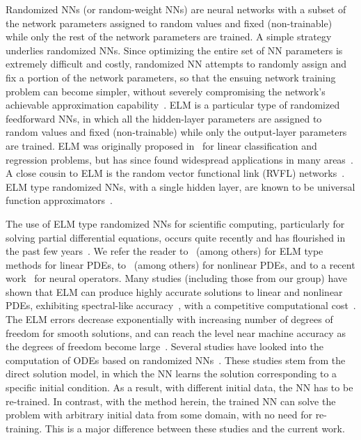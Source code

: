 Randomized NNs (or random-weight NNs)
are neural networks 
with a subset of the network parameters assigned to random values and fixed (non-trainable)
while only the rest of the network parameters are trained.
A simple strategy underlies randomized NNs. Since optimizing
the entire set of NN parameters is extremely difficult and  costly,
randomized NN attempts to randomly assign and fix a portion of the network parameters,
so that the ensuing network training problem can become simpler,
without severely compromising the network's achievable approximation
capability~\cite{DongY2022rm,NiD2023}.
ELM is a particular type of randomized feedforward NNs, in which all the hidden-layer
parameters are assigned to random values and fixed (non-trainable) while
only the output-layer parameters are trained. ELM was originally proposed
in~\cite{HuangZS2006} for linear classification and regression problems,
but has since found widespread applications  in many areas~\cite{Alabaetal2019}.
A close cousin to ELM is the %
random vector functional link (RVFL) networks~\cite{PaoPS1994}.
ELM type  randomized NNs, with a single hidden layer,
are known to be universal function
approximators~\cite{IgelnikP1995,HuangCS2006,Gonon2023}.



The use of ELM type randomized NNs  for scientific computing,
particularly for solving partial differential equations, occurs quite recently
and has flourished in the past few
years~\cite{DongL2021,Schiassietal2021,CalabroFS2021,WangD2024}.
We refer the reader to~\cite{PanghalK2020,DwivediS2020,DongL2021,LiuHWC2021,CalabroFS2021,ChenCEY2022,LiLX2023,QuanH2023,Calabroetal2023,SunDF2024} (among others) for ELM type methods
for linear PDEs, to~\cite{DongL2021,DongL2021bip,Schiassietal2021,FabianiCRS2021,DongY2022rm,NiD2023,DongW2023,WangD2024} (among others) for nonlinear PDEs,
and to a recent work~\cite{FabianiKSY2025} for neural operators.
%
Many studies (including those from our group) have shown that
ELM  can produce highly accurate solutions to linear and nonlinear
PDEs, exhibiting spectral-like accuracy~\cite{DongL2021,NiD2023},
with a competitive computational cost~\cite{DongY2022rm}.
The ELM errors decrease exponentially
with increasing number of degrees of freedom for smooth solutions, and
can reach the level near machine accuracy as the degrees of freedom
become large~\cite{DongY2022rm}. 
%
Several studies have looked into the computation of ODEs
based on randomized NNs~\cite{YangHL2018,LiuXWL2020,PanghalK2020,DongL2021,Schiassietal2022,FabianiGRS2023,FlorioSCF2023}.
These studies stem from the direct solution model, in which the NN
learns the solution corresponding to a specific  initial condition.
As a result, with different initial data,
the NN  has to be re-trained.
In contrast, with the method herein,
the trained NN  can solve the problem with arbitrary initial data from some
domain, with no need for re-training. This is a major difference between
these studies and the  current work.


